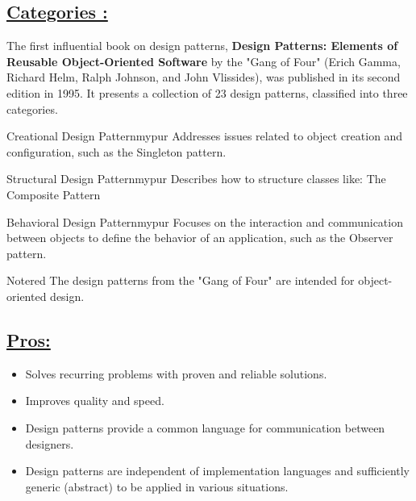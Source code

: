 \vspace{0.25cm}
\subsection*{\underline{Categories :}}
The first influential book on design patterns, \textbf{Design Patterns: Elements of Reusable
Object-Oriented Software} by the "Gang of Four" (Erich Gamma, Richard Helm,
Ralph Johnson, and John Vlissides), was published in its second edition in 1995.
It presents a collection of 23 design patterns, classified into three categories.


\vspace{0.75cm}

\begin{prettyBox}{Creational Design Pattern}{mypur}
Addresses issues related to object creation and configuration, such as the Singleton pattern.
\end{prettyBox}

\vspace{0.25cm}
\begin{prettyBox}{Structural Design Pattern}{mypur}
Describes how to structure classes like: The Composite Pattern
\end{prettyBox}


\vspace{0.25cm}

\begin{prettyBox}{Behavioral Design Pattern}{mypur}
Focuses on the interaction and communication between objects to define
the behavior of an application, such as the Observer pattern.
\end{prettyBox}


\vspace{0.25cm}
\begin{prettyBox}{Note}{red}
The design patterns from the "Gang of Four" are intended for
object-oriented design.
\end{prettyBox}

\vspace{0.25cm}

\subsection*{\underline{Pros:}}
\begin{itemize}
    \item Solves recurring problems with proven and reliable solutions.
    \item Improves quality and speed.
    \item Design patterns provide a common language for communication between designers.
    \item Design patterns are independent of implementation languages and sufficiently generic (abstract) to be applied in various situations.
\end{itemize}

